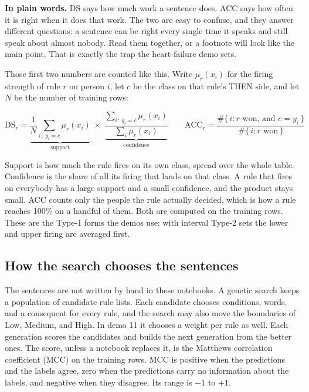 \documentclass[11pt]{article}
\newcommand{\pct}[1]{\mbox{#1\%}}
\begin{document}
\begin{plainwords}
\textbf{In plain words.} DS says how much work a sentence does. ACC says how often it is right when it does that work. The two are easy to confuse, and they answer different questions: a sentence can be right every single time it speaks and still speak about almost nobody. Read them together, or a footnote will look like the main point. That is exactly the trap the heart-failure demo sets.
\end{plainwords}

Those first two numbers are counted like this. Write \(\mu_r(x_i)\) for the firing strength of rule \(r\) on person \(i\), let \(c\) be the class on that rule's THEN side, and let \(N\) be the number of training rows:

\[
\mathrm{DS}_r
=
\underbrace{\frac{1}{N}\sum_{i\,:\,y_i = c} \mu_r(x_i)}_{\text{support}}
\;\times\;
\underbrace{\frac{\sum_{i\,:\,y_i = c} \mu_r(x_i)}{\sum_{i} \mu_r(x_i)}}_{\text{confidence}}
\qquad
\mathrm{ACC}_r
=
\frac{\#\{\,i : r \text{ won, and } c = y_i\,\}}{\#\{\,i : r \text{ won}\,\}}
\]

Support is how much the rule fires on its own class, spread over the whole table. Confidence is the share of all its firing that lands on that class. A rule that fires on everybody has a large support and a small confidence, and the product stays small. ACC counts only the people the rule actually decided, which is how a rule reaches \pct{100} on a handful of them. Both are computed on the training rows. These are the Type-1 forms the demos use; with interval Type-2 sets the lower and upper firing are averaged first.

\subsection{How the search chooses the sentences}
\label{sec:search}

The sentences are not written by hand in these notebooks. A genetic search keeps a population of candidate rule lists. Each candidate chooses conditions, words, and a consequent for every rule, and the search may also move the boundaries of Low, Medium, and High. In demo 11 it chooses a weight per rule as well. Each generation scores the candidates and builds the next generation from the better ones. The score, unless a notebook replaces it, is the Matthews correlation coefficient (MCC) on the training rows. MCC is positive when the predictions and the labels agree, zero when the predictions carry no information about the labels, and negative when they disagree. Its range is \(-1\) to \(+1\).
\end{document}

